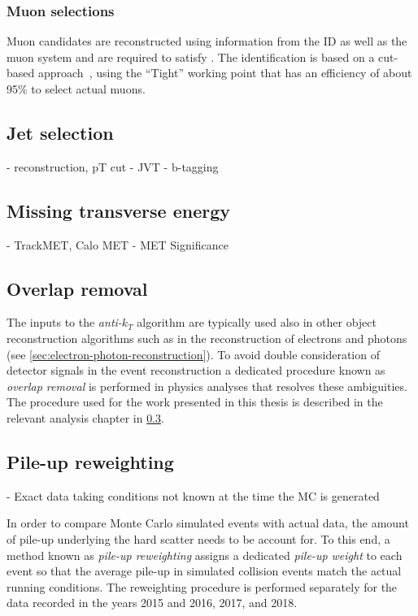 \subsubsection{Muon selections}
Muon candidates are reconstructed using information from the ID as well as the muon system and are required to satisfy . 
The identification is based on a cut-based approach~\cite{MUON-2018-03}, using the ``Tight'' working point that has an efficiency of about 95\% to select actual muons. 

\subsection{Jet selection}
- reconstruction, pT cut
- JVT
- b-tagging


\subsection{Missing transverse energy}
- TrackMET, Calo MET
- MET Significance


\subsection{Overlap removal}
\label{subsec:overlap-removal}

The inputs to the \emph{anti-$k_T$} algorithm are typically used also in other object reconstruction algorithms such as in the reconstruction of electrons and photons (see \cref{sec:electron-photon-reconstruction}).
To avoid double consideration of detector signals in the event reconstruction a dedicated procedure known as \emph{overlap removal} is performed in physics analyses that resolves these ambiguities. The procedure used for the work presented in this thesis is described in the relevant analysis chapter in \cref{subsec:overlap-removal}.


\subsection{Pile-up reweighting}

- Exact data taking conditions not known at the time the MC is generated


In order to compare Monte Carlo simulated events with actual data, the amount of pile-up underlying the hard scatter needs to be account for.
To this end, a method known as \emph{pile-up reweighting} assigns a dedicated \emph{pile-up weight} to each event so that the average pile-up in simulated collision events match the actual running conditions. The reweighting procedure is performed separately for the data recorded in the years 2015 and 2016, 2017, and 2018.
